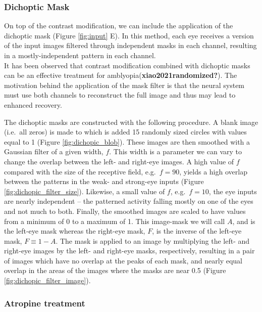 \documentclass[
  onecolumn]{article}
\begin{document}
\hypertarget{dichoptic-mask}{%
\subsubsection{Dichoptic Mask}\label{dichoptic-mask}}

On top of the contrast modification, we can include the application of
the dichoptic mask (Figure \ref{fig:input} E). In this method, each eye
receives a version of the input images filtered through independent
masks in each channel, resulting in a mostly-independent pattern in each
channel.\\
It has been observed that contrast modification combined with dichoptic
masks can be an effective treatment for
amblyopia(\textbf{xiao2021randomized?}). The motivation behind the
application of the mask filter is that the neural system must use both
channels to reconstruct the full image and thus may lead to enhanced
recovery.

The dichoptic masks are constructed with the following procedure. A
blank image (i.e.~all zeros) is made to which is added 15 randomly sized
circles with values equal to 1 (Figure \ref{fig:dichopic_blob}). These
images are then smoothed with a Gaussian filter of a given width, \(f\).
This width is a parameter we can vary to change the overlap between the
left- and right-eye images. A high value of \(f\) compared with the size
of the receptive field, e.g.~\(f=90\), yields a high overlap between the
patterns in the weak- and strong-eye inputs (Figure
\ref{fig:dichopic_filter_size}). Likewise, a small value of \(f\),
e.g.~\(f=10\), the eye inputs are nearly independent -- the patterned
activity falling mostly on one of the eyes and not much to both.
Finally, the smoothed images are scaled to have values from a minimum of
0 to a maximum of 1. This image-mask we will call \(A\), and is the
left-eye mask whereas the right-eye mask, \(F\), is the inverse of the
left-eye mask, \(F\equiv 1-A\). The mask is applied to an image by
multiplying the left- and right-eye images by the left- and right-eye
masks, respectively, resulting in a pair of images which have no overlap
at the peaks of each mask, and nearly equal overlap in the areas of the
images where the masks are near 0.5 (Figure
\ref{fig:dichopic_filter_image}).

\hypertarget{atropine-treatment}{%
\subsubsection{Atropine treatment}\label{atropine-treatment}}
\end{document}

